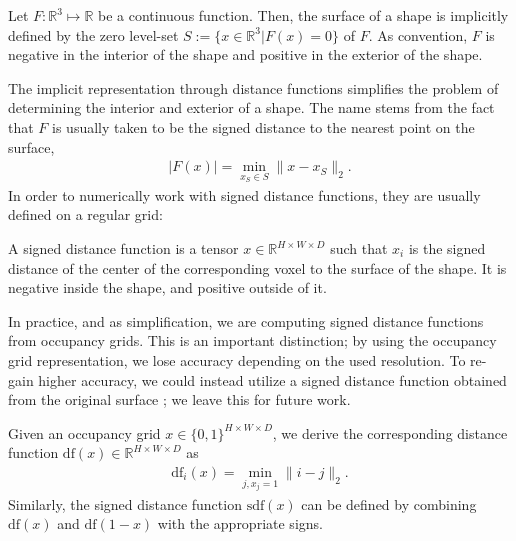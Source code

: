 \begin{definition}
  Let $F:\mathbb{R}^3 \mapsto \mathbb{R}$ be a continuous function. Then,
  the surface of a shape is implicitly defined by the zero level-set
  $S := \{x \in \mathbb{R}^3 | F(x) = 0\}$ of $F$. As convention, $F$ is negative
  in the interior of the shape and positive in the exterior of the shape.
\end{definition}

The implicit representation through distance functions simplifies the problem
of determining the interior and exterior of a shape. The name stems from the
fact that $F$ is usually taken to be the signed distance to the nearest point
on the surface, \eg
\begin{align}
  |F(x)| = \min_{x_S \in S} \|x - x_S\|_2.
\end{align}
In order to numerically work with signed distance functions, they are usually
defined on a regular grid:

\begin{definition}
  A signed distance function is a tensor $x \in \mathbb{R}^{H \times W \times D}$
  such that $x_i$ is the signed distance of the center of the corresponding voxel
  to the surface of the shape. It is negative inside the shape, and positive
  outside of it.
\end{definition}

In practice, and as simplification, we are computing signed distance functions
from occupancy grids. This is an important distinction; by using the
occupancy grid representation, we lose accuracy depending
on the used resolution. To re-gain higher accuracy, we could instead utilize a
signed distance function obtained from the original surface
\cite{LorensenCline:1987,BotschKobbelt:2010}; we leave this for future work.

\begin{remark}
  \label{rem:shape-representation-distance-function}
  Given an occupancy grid $x \in \{0,1\}^{H \times W \times D}$, we
  derive the corresponding distance function
  $\text{df}(x) \in \mathbb{R}^{H \times W \times D}$ as
  \begin{align}
    \text{df}_i(x) = \min_{j, x_j = 1} \|i - j\|_2.
  \end{align}
  Similarly, the signed distance function $\text{sdf}(x)$ can be
  defined by combining $\text{df}(x)$ and $\text{df}(1 - x)$
  with the appropriate signs.
\end{remark}

